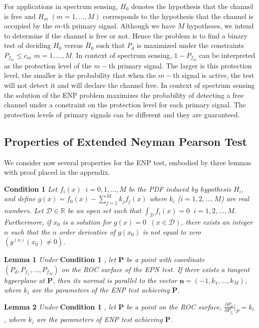 \documentclass[12pt,journal,a4paper,twoside,doublecolumn]{IEEEtran}
\begin{document}
\begin{spacing}{1.0}
For applications in spectrum sensing, $H_0$ denotes the hypothesis that the channel is free and $H_m \;(m=1, ..., M)$ corresponds to the hypothesis that the channel is occupied by the $m$-th primary signal. Although we have $M$ hypotheses, we intend to determine if the channel is free or not. Hence the problem is to find a binary test of deciding $H_0$ versus $\bar{H}_0$ such that $P_d$ is maximized under the constraints $P_{f_m} \leq c_m$ $m = 1, ..., M$. In context of spectrum sensing, $1-P_{f_m}$ can be interpreted as the protection level of the $m-$th primary signal. The larger is this protection level, the smaller is the probability that when the $m-$th signal is active, the test will not detect it and will declare the channel free. In context of spectrum sensing the solution of the ENP problem maximizes the probability of detecting a free channel under a constraint on the protection level for each primary signal. The protection levels of primary signals can be different and they are guaranteed.

\subsection{Properties of Extended Neyman Pearson Test}
We consider now several properties for the ENP test, embodied by three lemmas with proof placed in the appendix.

\noindent \textbf{Condition 1}
\textit{
\noindent Let $f_i(x) \;\;i=0, 1, ..., M$ be the PDF induced by hypothesis $H_i$, and define $g(x) = f_0(x) - \sum_{j=1}^{M} k_jf_j(x)$ where $k_i$  ($i = 1, 2, ..., M$) are real numbers. Let $\mathcal{D} \in \mathbb{R}$ be an open set such that $\int_{\bar{\mathcal{D}}}f_i(x)=0\;\;i = 1, 2, ..., M$. Furthermore,  if $x_0$ is a solution  for $g(x) = 0 \;\;(x \in \mathcal{D})$, there exists an integer $n$ such that  the $n$ order derivative of $g(x_0)$ is not equal to zero $(g^{(n)}(x_0) \neq 0)$.
}

\noindent \textbf{Lemma 1}
\textit{
\noindent Under}
\textbf{Condition 1}
\textit{, let $\mathbf{P}$ be a point with coordinate $(P_d, P_{f_1}, ..., P_{f_M})$ on the ROC surface of the EPN test. If there exists a tangent hyperplane at $\mathbf{P}$, then its normal is parallel to the vector $\mathbf{n} = (-1, k_1, ..., k_M)$, where $k_i$ are the parameters of the ENP test achieving $\mathbf{P}$.
}

\noindent \textbf{Lemma 2}
\textit{
\noindent
Under}
\textbf{Condition 1}
\textit{, let $\mathbf{P}$ be a point on the ROC surface, $\frac{\partial P_d}{\partial P_{f_i}} \bigg|_P = k_i$, where $k_i$ are the parameters of ENP test achieving $\mathbf{P}$.
}


\end{spacing}
\end{document}
